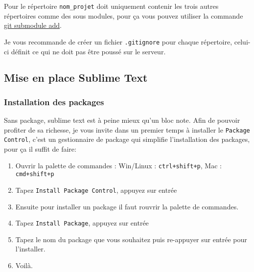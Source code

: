 \documentclass[a4paper,12pt]{article}
\begin{document}
Pour le répertoire \texttt{nom\_projet} doit uniquement contenir les trois autres répertoires comme des sous modules, pour ça vous pouvez utiliser la commande \href{https://git-scm.com/book/en/v2/Git-Tools-Submodules}{git submodule add}.

Je vous recommande de créer un fichier \texttt{.gitignore} pour chaque répertoire, celui-ci définit ce qui ne doit pas être poussé sur le serveur.  


\subsection{Mise en place Sublime Text}

\subsubsection{Installation des packages}


Sans package, sublime text est à peine mieux qu'un bloc note. Afin de pouvoir profiter de sa richesse, je vous invite dans un premier temps à installer le \texttt{Package Control}, c'est un gestionnaire de package qui simplifie l'installation des packages, pour ça il suffit de faire:

\begin{enumerate}
    \item Ouvrir la palette de commandes : Win/Linux : \texttt{ctrl+shift+p}, Mac : \texttt{cmd+shift+p}
    \item Tapez \texttt{Install Package Control}, appuyez sur entrée
    \item Ensuite pour installer un package il faut rouvrir la palette de commandes.
    \item Tapez \texttt{Install Package}, appuyez sur entrée
    \item Tapez le nom du package que vous souhaitez puis re-appuyer sur entrée pour l'installer.
    \item Voilà.
\end{enumerate}    
\end{document}
